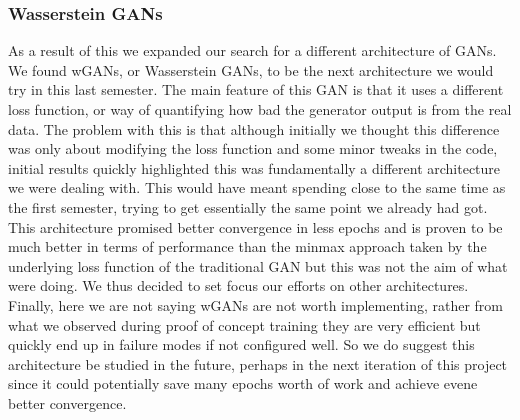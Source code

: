 \documentclass[11pt]{article} %
\begin{document}
\subsubsection{Wasserstein GANs}
As a result of this we expanded our search for a different architecture of GANs.
We found wGANs, or Wasserstein GANs, to be the next architecture we would try in this last semester.
The main feature of this GAN is that it uses a different loss function, or way of quantifying how bad the generator output is from the real data.
The problem with this is that although initially we thought this difference was only about modifying the loss function and some minor tweaks in the code,
initial results quickly highlighted this was fundamentally a different architecture we were dealing with.
This would have meant spending close to the same time as the first semester, trying to get essentially the same point we already had got.
This architecture promised better convergence in less epochs and is proven to be much better in terms of performance than the minmax approach taken by the
underlying loss function of the traditional GAN but this was not the aim of what were doing.
We thus decided to set focus our efforts on other architectures.
Finally, here we are not saying wGANs are not worth implementing, rather from what we observed during
proof of concept training they are very efficient but quickly end up in failure modes if not configured well.
So we do suggest this architecture be studied in the future, perhaps in the next iteration of this project since it could potentially
save many epochs worth of work and achieve evene better convergence.
\end{document}
